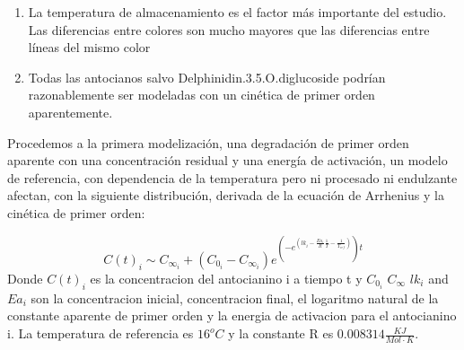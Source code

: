 \documentclass[
]{article}
\providecommand{\tightlist}{%
  \setlength{\itemsep}{0pt}\setlength{\parskip}{0pt}}
\begin{document}
\begin{enumerate}
\def\labelenumi{\arabic{enumi}.}
\tightlist
\item
  La temperatura de almacenamiento es el factor más importante del
  estudio. Las diferencias entre colores son mucho mayores que las
  diferencias entre líneas del mismo color
\item
  Todas las antocianos salvo Delphinidin.3.5.O.diglucoside podrían
  razonablemente ser modeladas con un cinética de primer orden
  aparentemente.
\end{enumerate}

Procedemos a la primera modelización, una degradación de primer orden
aparente con una concentración residual y una energía de activación, un
modelo de referencia, con dependencia de la temperatura pero ni
procesado ni endulzante afectan, con la siguiente distribución, derivada
de la ecuación de Arrhenius y la cinética de primer orden:

\[C(t)_i \sim C_{\infty_i}+(C_{0_i}-C_{\infty_i})e^{(-e^{(lk_i-\frac{Ea_i}{R} \frac{1}{ T}-\frac{1}{T_{ref}})})t}\]
Donde \(C(t)_i\) es la concentracion del antocianino i a tiempo t y
\(C_{0_i}\) \(C_{\infty}\) \(lk_i\) and \(Ea_i\) son la concentracion
inicial, concentracion final, el logaritmo natural de la constante
aparente de primer orden y la energia de activacion para el antocianino
i. La temperatura de referencia es \(16^oC\) y la constante R es
\(0.008314 \frac{KJ}{Mol\cdot K}\).
\end{document}
